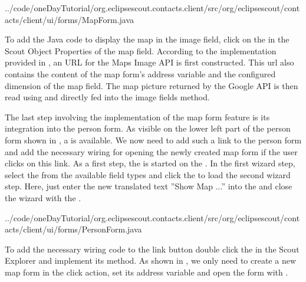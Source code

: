 \documentclass[a4paper,10pt,twoside]{book}
\begin{document}

{../code/oneDayTutorial/org.eclipsescout.contacts.client/src/org/eclipsescout/contacts/client/ui/forms/MapForm.java}

To add the Java code to display the map in the image field, click on the  in the Scout Object Properties of the map field. 
According to the implementation provided in , an URL for the Maps Image API is first constructed. 
This url also contains the content of the map form's address variable and the configured dimension of the map field. 
The map picture returned by the Google API is then read using  and directly fed into the image fields  method. 

The last step involving the implementation of the map form feature is its integration into the person form. 
As visible on the lower left part of the person form shown in , a  is available. 
We now need to add such a link to the person form and add the necessary wiring for opening the newly created map form if the user clicks on this link. 
As a first step, the  is started on the . 
In the first wizard step, select the  from the available field types and click the  to load the second wizard step. 
Here, just enter the new translated text ''Show Map ...'' into the  and close the wizard with the . 


{../code/oneDayTutorial/org.eclipsescout.contacts.client/src/org/eclipsescout/contacts/client/ui/forms/PersonForm.java}

To add the necessary wiring code to the link button double click the  in the Scout Explorer and implement its  method.
As shown in , we only need to create a new map form in the click action, set its address variable and open the form with .
\end{document}
